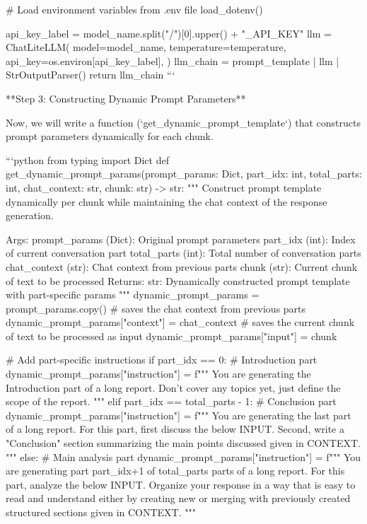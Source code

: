 {{    # Load environment variables from .env file
    load_dotenv()
    
    api_key_label = model_name.split("/")[0].upper() + "_API_KEY"
    llm = ChatLiteLLM(
        model=model_name,
        temperature=temperature,
        api_key=os.environ[api_key_label],
    )
    llm_chain = prompt_template | llm | StrOutputParser()
    return llm_chain
```

**Step 3: Constructing Dynamic Prompt Parameters**

Now, we will write a function (`get_dynamic_prompt_template`) that constructs prompt parameters dynamically for each chunk.


```python
from typing import Dict
def get_dynamic_prompt_params(prompt_params: Dict, 
                            part_idx: int, 
                            total_parts: int,
                            chat_context: str,
                            chunk: str) -> str:
    """
    Construct prompt template dynamically per chunk while maintaining the chat context of the response generation.
    
    Args:
        prompt_params (Dict): Original prompt parameters
        part_idx (int): Index of current conversation part
        total_parts (int): Total number of conversation parts
        chat_context (str): Chat context from previous parts
        chunk (str): Current chunk of text to be processed
    Returns:
        str: Dynamically constructed prompt template with part-specific params
    """
    dynamic_prompt_params = prompt_params.copy()
    # saves the chat context from previous parts
    dynamic_prompt_params["context"] = chat_context
    # saves the current chunk of text to be processed as input
    dynamic_prompt_params["input"] = chunk
    
    # Add part-specific instructions
    if part_idx == 0: # Introduction part
        dynamic_prompt_params["instruction"] = f"""
        You are generating the Introduction part of a long report.
        Don't cover any topics yet, just define the scope of the report.
        """
    elif part_idx == total_parts - 1: # Conclusion part
        dynamic_prompt_params["instruction"] = f"""
        You are generating the last part of a long report. 
        For this part, first discuss the below INPUT. Second, write a "Conclusion" section summarizing the main points discussed given in CONTEXT.
        """
    else: # Main analysis part
        dynamic_prompt_params["instruction"] = f"""
        You are generating part {part_idx+1} of {total_parts} parts of a long report.
        For this part, analyze the below INPUT.
        Organize your response in a way that is easy to read and understand either by creating new or merging with previously created structured sections given in CONTEXT.
        """
    
}}
